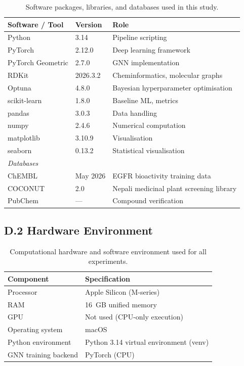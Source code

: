 \begin{table}[H]
\caption{Software packages, libraries, and databases
         used in this study.}
\label{tab:app_software}
\centering
\small
\begin{tabular}{@{}p{3.8cm}p{2.2cm}p{7.2cm}@{}}
\toprule
\textbf{Software / Tool} & \textbf{Version}
                         & \textbf{Role} \\
\midrule
Python          & 3.14      & Pipeline scripting \\
PyTorch         & 2.12.0    & Deep learning framework \\
PyTorch Geometric & 2.7.0   & GNN implementation \\
RDKit           & 2026.3.2  & Cheminformatics, molecular graphs \\
Optuna          & 4.8.0     & Bayesian hyperparameter optimisation \\
scikit-learn    & 1.8.0     & Baseline ML, metrics \\
pandas          & 3.0.3     & Data handling \\
numpy           & 2.4.6     & Numerical computation \\
matplotlib      & 3.10.9    & Visualisation \\
seaborn         & 0.13.2    & Statistical visualisation \\
\midrule
\textit{Databases} & & \\
ChEMBL          & May 2026  & EGFR bioactivity training data \\
COCONUT         & 2.0       & Nepali medicinal plant
                              screening library \\
PubChem         & ---       & Compound verification \\
\bottomrule
\end{tabular}
\end{table}

\subsection*{D.2 Hardware Environment}

\begin{table}[H]
\caption{Computational hardware and software environment
         used for all experiments.}
\label{tab:app_hardware}
\centering
\begin{tabular}{@{}p{5cm}p{8cm}@{}}
\toprule
\textbf{Component} & \textbf{Specification} \\
\midrule
Processor
  & Apple Silicon (M-series) \\
RAM
  & 16~GB unified memory \\
GPU
  & Not used (CPU-only execution) \\
Operating system
  & macOS \\
Python environment
  & Python 3.14 virtual environment (venv) \\
GNN training backend
  & PyTorch (CPU) \\
\bottomrule
\end{tabular}
\end{table}


